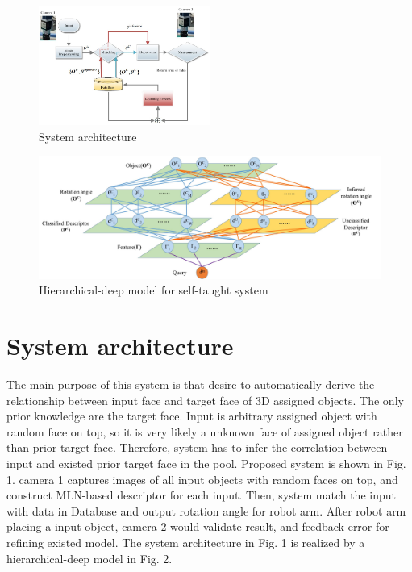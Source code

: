 \documentclass[journal]{IEEEtran}
\begin{document}
\begin{figure}[!t]
\begin{center}
\includegraphics[width=0.5\textwidth]{j_img/fig1.jpg}
\caption{System architecture}\label{test}
\end{center}
\end{figure}

\begin{figure}[!t]
\begin{center}
\includegraphics*[width=7 in]{j_img/fig3.jpg}
\caption{Hierarchical-deep model for self-taught system}\label{test}
\end{center}
\end{figure}


\section{System architecture} 

The main purpose of this system is that desire to automatically derive the relationship between input face and target face of 3D assigned objects. The only prior knowledge are the target face. Input is arbitrary assigned object with random face on top, so it is very likely a unknown face of assigned object rather than prior target face. Therefore, system has to infer the correlation between input and existed prior target face in the pool.  Proposed system is shown in Fig. 1. camera 1 captures images of all input objects with random faces on top, and 
construct MLN-based descriptor for each input. Then, system match the input with data in Database and output rotation angle for robot arm. After robot arm placing a input object, camera 2 would validate result, and feedback error for refining existed model. The system architecture in Fig. 1 is realized by a hierarchical-deep model in Fig. 2. 
\end{document}
